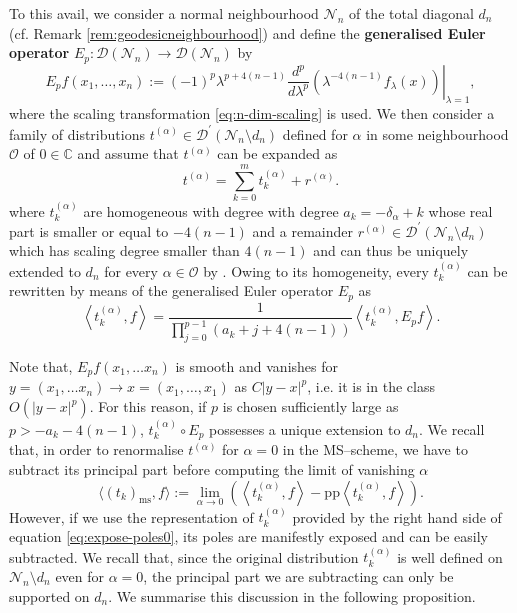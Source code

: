 \documentclass[a4paper,10pt,twoside]{article}
\numberwithin{equation}{section}
\newcounter{and}
\def\N{\mathcal{N}}
\def\D{\mathcal{D}}
\def\OO{\mathcal{O}}
\def\pp{\mathrm{pp}}
\def\ms{\mathrm{ms}}
\def\beq{\begin{equation}}
\def\eeq{\end{equation}}
\theoremstyle{plain}
\theoremstyle{definition}
\begin{document}
To this avail, we consider a normal neighbourhood $\N_n$ of the total diagonal $d_n$ (cf. Remark \ref{rem:geodesicneighbourhood}) and define the {\bf generalised Euler operator} $E_p:\D(\N_n)\to\D(\N_n)$ by
%
\beq\label{def:geneuler}
E_p f (x_1,\dots, x_n) := (-1)^p \left. \lambda^{p+4(n-1)} \frac{d^p}{d\lambda^p}\left( \lambda^{-4(n-1)}  f_\lambda(x)\right)\right|_{\lambda = 1},
\eeq
%
where the scaling transformation \eqref{eq:n-dim-scaling} is used. We then consider a family of distributions $t^{(\alpha)}\in \D^\prime(\N_n\setminus d_n)$ defined for $\alpha$ in some neighbourhood $\OO$ of $0\in \mathbb{C}$ and assume that $t^{(\alpha)}$ can be expanded as
%
\[
t^{(\alpha)}  = \sum_{k=0}^m t^{(\alpha)}_k + r^{(\alpha)}.
\]
%
where $t^{(\alpha)}_k$ are homogeneous with degree with degree $a_k=-\delta_\alpha+k$ whose real part is smaller or equal to $-4(n-1)$ and a remainder $r^{(\alpha)}\in \D^\prime(\N_n\setminus d_n)$ which has scaling degree smaller than $4(n-1)$ and can thus be uniquely extended to $d_n$ for every $\alpha\in \OO$ by \cite[Theorem 5.2]{Brunetti-Fredenhagen:2000}. Owing to its homogeneity, every $t^{(\alpha)}_k$ can be rewritten by means of the generalised Euler operator $E_p$ as
\begin{equation}\label{eq:expose-poles0}
\left\langle t^{(\alpha)}_k, f \right\rangle   =   \frac{1}{\prod_{j=0}^{p-1} (a_k+j+4(n-1))}   \left \langle t^{(\alpha)}_k, E_p f \right\rangle.
\end{equation}

Note that, $E_p f(x_1, \dots x_n)$ is smooth and vanishes for $y=(x_1, \dots x_n) \to x=(x_1, \dots, x_1)$ as $C|y-x|^p$, i.e. it is in the class $O(|y-x|^{p})$. For this reason, if  $p$ is chosen sufficiently large as $p > -a_k-4(n-1)$, $t^{(\alpha)}_k\circ E_p$ possesses a unique extension to $d_n$. We recall that, in order to renormalise $t^{(\alpha)}$ for $\alpha=0$ in the MS--scheme, we have to subtract its principal part before computing the limit of vanishing $\alpha$
\[
\langle (t_k)_\ms, f \rangle:=\lim_{\alpha\to 0 } \left(\left\langle t^{(\alpha)}_k, f \right\rangle - \pp \left\langle t^{(\alpha)}_k, f \right\rangle  \right).
\]
However, if we use the representation of $t^{(\alpha)}_k$ provided by the right hand side of equation \eqref{eq:expose-poles0}, its poles are manifestly exposed and can be easily subtracted.
We recall that, since the original distribution $t^{(\alpha)}_k$ is well defined on $\N_n\setminus d_n$ even for $\alpha=0$, the principal part we are subtracting can only be supported on $d_n$. We summarise this discussion in the following proposition.
\end{document}

